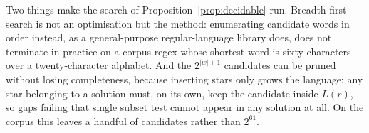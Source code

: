 \begin{remark}\label{rem:search-impl}
Two things make the search of Proposition~\ref{prop:decidable} run.
Breadth-first search is not an optimisation but the
method: enumerating candidate words in order instead, as a general-purpose regular-language
library does, does not terminate in practice on a corpus regex whose shortest word is
sixty characters over a twenty-character alphabet. And the $2^{|w|+1}$ candidates can be
pruned without losing completeness, because inserting stars only grows the language: any
star belonging to a solution must, on its own, keep the candidate inside $L(r)$, so gaps
failing that single subset test cannot appear in any solution at all. On the corpus this
leaves a handful of candidates rather than $2^{61}$.
\end{remark}
